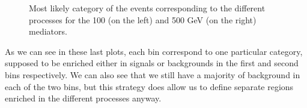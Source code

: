 \documentclass[a4paper, 10pt, openright]{report}
\begin{document}
\begin{figure}[htbp]
\caption{Most likely category of the events corresponding to the different processes for the 100 (on the left) and 500 GeV (on the right) mediators.}
\label{fig:weightsApplied}
\end{figure}

As we can see in these last plots, each bin correspond to one particular category, supposed to be enriched either in signals or backgrounds in the first and second bins respectively. We can also see that we still have a majority of background in each of the two bins, but this strategy does allow us to define separate regions enriched in the different processes anyway.
\end{document}
